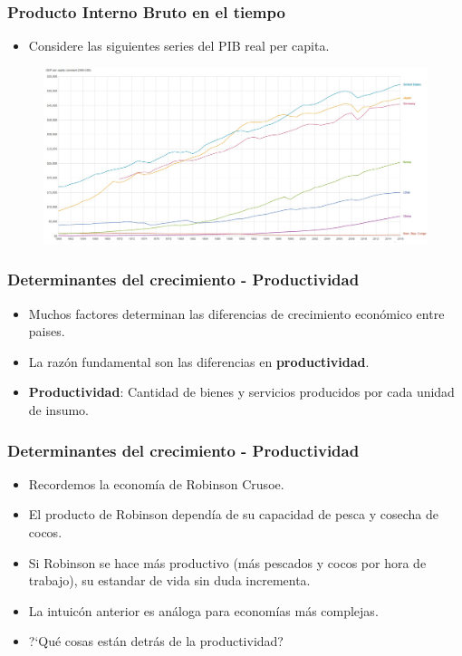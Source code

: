 \documentclass{beamer}
\begin{document}
\begin{frame}
\frametitle{Producto Interno Bruto en el tiempo}
\begin{itemize}
\item Considere las siguientes series del PIB real per capita. 
\end{itemize}
\begin{center}
\begin{figure}
\includegraphics[scale=0.265]{Figuras/PIB2}
\end{figure}
\end{center}
\end{frame}

\begin{frame}
\frametitle{Determinantes del crecimiento - Productividad}
\begin{itemize}
\setlength\itemsep{1.5em}
\item Muchos factores determinan las diferencias de crecimiento econ\'omico entre paises. 
\item La raz\'on fundamental son las diferencias en \textbf{productividad}.
\item \textbf{Productividad}: Cantidad de bienes y servicios producidos por cada unidad de insumo.
\end{itemize}
\end{frame}

\begin{frame}
\frametitle{Determinantes del crecimiento - Productividad}
\begin{itemize}
\setlength\itemsep{1.4em}
\item Recordemos la econom\'ia de Robinson Crusoe.
\item El producto de Robinson depend\'ia de su capacidad de pesca y cosecha de cocos.
\item Si Robinson se hace m\'as productivo (m\'as pescados y cocos por hora de trabajo), su estandar de vida sin duda incrementa.
\item La intuic\'on anterior es an\'aloga para econom\'ias m\'as complejas.
\item ?`Qu\'e cosas est\'an detr\'as de la productividad?
\end{itemize}
\end{frame}
\end{document}
